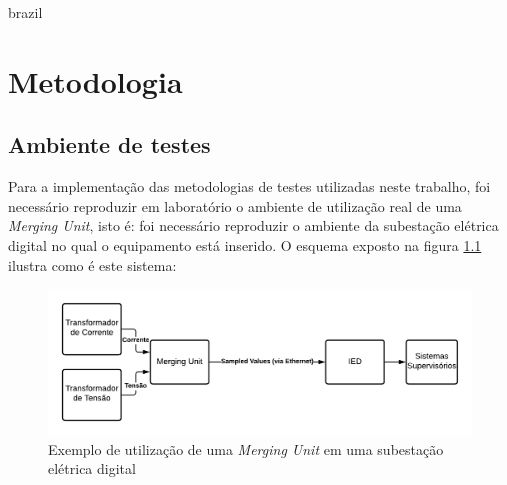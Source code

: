 

\begin{otherlanguage*}{brazil}

\chapter{Metodologia}

\label{cap_metodologia}

\section{Ambiente de testes} %

Para a implementação das metodologias de testes utilizadas neste trabalho, foi necessário reproduzir em laboratório o ambiente de utilização real de uma \textit{Merging Unit}, isto é: foi necessário reproduzir o ambiente da subestação elétrica digital no qual o equipamento está inserido. O esquema exposto na figura \ref{fig:diag_substation} ilustra como é este sistema:

\begin{figure}[H]
    \centering
    \includegraphics[width=12cm]{pictures/diag_substation_tcc.png}
    \caption{Exemplo de utilização de uma \textit{Merging Unit} em uma subestação elétrica digital}
    \label{fig:diag_substation}
\end{figure}


\end{otherlanguage*}
